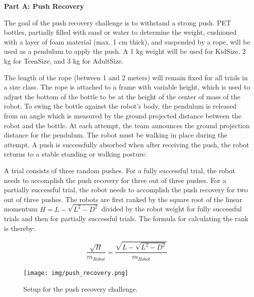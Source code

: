 \clearpage
\sffamily
{\bfseries\color[rgb]{0.4,0.4,0.4}
Part A: Push Recovery }

\bigskip

The goal of the push recovery challenge is to withstand a strong push. PET bottles, partially filled with sand or water to determine the weight, cushioned with a layer of foam material (max. 1 cm thick), and suspended by a rope, will be used as a pendulum to apply the push. A 1 kg weight will be used for KidSize, 2 kg for TeenSize, and 3 kg for AdultSize. 

The length of the rope (between 1 and 2 meters) will remain fixed for all trials in a size class. The rope is attached to a frame with variable height, which is used to adjust the bottom of the bottle to be at the height of the center of mass of the robot. To swing the bottle against the robot's body, the pendulum is released from an angle which is measured by the ground projected distance between the robot and the bottle. At each attempt, the team announces the ground projection distance for the pendulum. The robot must be walking in place during the attempt. A push is successfully absorbed when after receiving the push, the robot returns to a stable standing or walking posture. 

A trial consists of three random pushes. For a fully successful trial, the robot needs to accomplish the push recovery for three out of three pushes. For a partially successful trial, the robot needs to accomplish the push recovery for two out of three pushes. The robots are first ranked by the square root of the linear momentum $H = L - \sqrt{L^{2} - D^{2}}$ divided by the robot weight for fully successful trials and then for partially successful trials. The formula for calculating the rank is thereby:

\begin{align*}
\dfrac{\sqrt{H}}{m_{Robot}} =  \dfrac{\sqrt{L - \sqrt{L^{2} - D^{2}}}}{m_{Robot}}
\end{align*}

\begin{figure}[h]
\begin{center}
\texttt{[image: img/push\_recovery.png]}
\caption{Setup for the push recovery challenge. }
\end{center}
\end{figure}